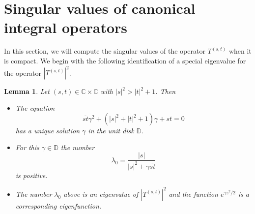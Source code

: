 \documentclass[reqno]{amsart}
\newtheorem{lemma}[theorem]{Lemma}
\newcommand{\C}{{\mathbb C}}
\newcommand{\D}{{\mathbb D}}
\begin{document}
\section{Singular values of canonical integral operators}

In this section, we will compute the singular values of the operator
$T^{(s,t)}$ when it is compact. We begin with the following
identification of a special eigenvalue for the operator
$\left|T^{(s,t)}\right|^2$.

\begin{lemma}\label{existenceofgamma}
Let $(s, t)\in\C\times\C$ with $|s|^2>|t|^2+1$. Then
\begin{itemize}
\item[(a)] The equation
\begin{equation}\label{choiceofgamma}
\overline{s t}\gamma^2+(|s|^2+|t|^2+1)\gamma+st=0
\end{equation}
has a unique solution $\gamma$ in the unit disk $\D$.
\item[(b)] For this $\gamma\in\D$ the number
$$\lambda_0=\frac{|s|}{|s|^2+\gamma\overline{st} }$$
is positive.
\item[(c)] The number $\lambda_0$ above is an eigenvalue of
$\left|T^{(s,t)}\right|^2$ and the function $e^{\gamma z^2/2}$ is
a corresponding eigenfunction.
\end{itemize}
\end{lemma}
\end{document}

